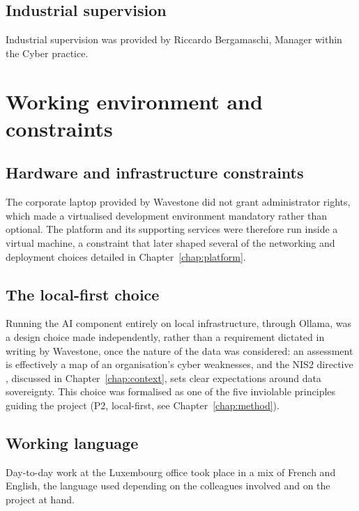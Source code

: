 \subsection{Industrial supervision}

Industrial supervision was provided by Riccardo Bergamaschi, Manager within
the Cyber practice.

\section{Working environment and constraints}
\label{sec:framing-environment}

\subsection{Hardware and infrastructure constraints}

The corporate laptop provided by Wavestone did not grant administrator
rights, which made a virtualised development environment mandatory rather
than optional. The platform and its supporting services were therefore run
inside a virtual machine, a constraint that later shaped several of the
networking and deployment choices detailed in Chapter~\ref{chap:platform}.

\subsection{The local-first choice}

Running the AI component entirely on local infrastructure, through Ollama,
was a design choice made independently, rather than a requirement dictated
in writing by Wavestone, once the nature of the data was considered: an
assessment is effectively a map of an organisation's cyber weaknesses, and
the NIS2 directive \cite{nis2_directive_2022}, discussed in
Chapter~\ref{chap:context}, sets clear expectations around data
sovereignty. This choice was formalised as one of the five inviolable
principles guiding the project (P2, local-first, see
Chapter~\ref{chap:method}).

\subsection{Working language}

Day-to-day work at the Luxembourg office took place in a mix of French and
English, the language used depending on the colleagues involved and on the
project at hand.

